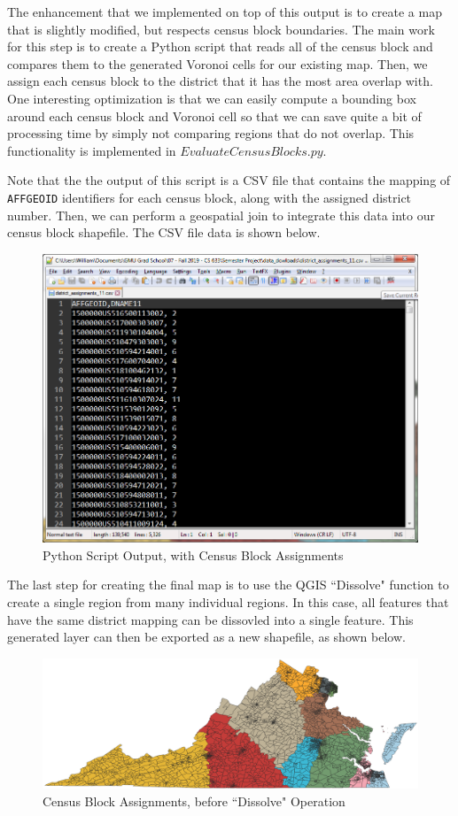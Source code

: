 \documentclass[11pt]{article}
\begin{document}
The enhancement that we implemented on top of this output is to create a map that is slightly modified, but respects census block boundaries. The main work for this step is to create a Python script that reads all of the census block and compares them to the generated Voronoi cells for our existing map. Then, we assign each census block to the district that it has the most area overlap with. One interesting optimization is that we can easily compute a bounding box around each census block and Voronoi cell so that we can save quite a bit of processing time by simply not comparing regions that do not overlap. This functionality is implemented in $EvaluateCensusBlocks.py$. 

\medskip

Note that the the output of this script is a CSV file that contains the mapping of \texttt{AFFGEOID} identifiers for each census block, along with the assigned district number. Then, we can perform a geospatial join to integrate this data into our census block shapefile. The CSV file data is shown below.

\begin{figure}[H]
	\centering
	\includegraphics[width=.55\textwidth]{da11}
	\caption{Python Script Output, with Census Block Assignments}
	\label{fig:cbass11}
\end{figure}

\medskip

The last step for creating the final map is to use the QGIS ``Dissolve" function to create a single region from many individual regions. In this case, all features that have the same district mapping can be dissovled into a single feature. This generated layer can then be exported as a new shapefile, as shown below.

\begin{figure}[H]
	\centering
	\includegraphics[width=.55\textwidth]{CBAssignments11}
	\caption{Census Block Assignments, before ``Dissolve" Operation}
	\label{fig:vmap11withcba}
\end{figure}
\end{document}
